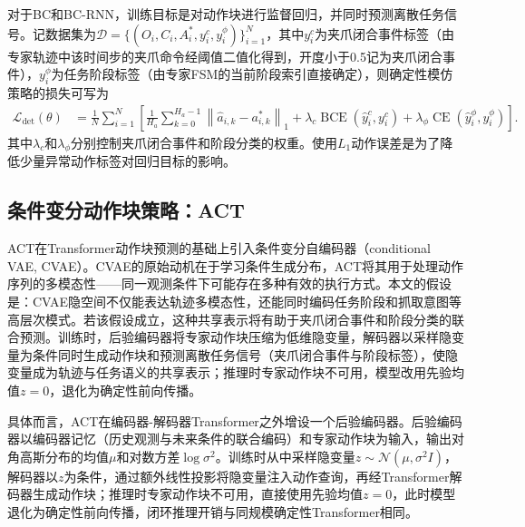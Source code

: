 对于BC和BC-RNN，训练目标是对动作块进行监督回归，并同时预测离散任务信号。记数据集为$\mathcal{D}=\{(O_i,C_i,A_i^*,y_i^c,y_i^\phi)\}_{i=1}^{N}$，其中$y_i^c$为夹爪闭合事件标签（由专家轨迹中该时间步的夹爪命令经阈值二值化得到，开度小于0.5记为夹爪闭合事件），$y_i^\phi$为任务阶段标签（由专家FSM的当前阶段索引直接确定），则确定性模仿策略的损失可写为
\begin{align}
    \mathcal{L}_{\mathrm{det}}(\theta)
    &= \frac{1}{N}\sum_{i=1}^{N}
    \left[
        \frac{1}{H_a}\sum_{k=0}^{H_a-1}
        \left\|\hat{a}_{i,k}-a^*_{i,k}\right\|_1
        + \lambda_c\operatorname{BCE}(\hat{y}^c_i,y^c_i)
        + \lambda_\phi\operatorname{CE}(\hat{y}^\phi_i,y^\phi_i)
    \right].
    \label{eq:deterministic-loss}
\end{align}
其中$\lambda_c$和$\lambda_\phi$分别控制夹爪闭合事件和阶段分类的权重。使用$L_1$动作误差是为了降低少量异常动作标签对回归目标的影响。

\subsection{条件变分动作块策略：ACT}

ACT在Transformer动作块预测的基础上引入条件变分自编码器（conditional VAE, CVAE）。CVAE的原始动机在于学习条件生成分布，ACT将其用于处理动作序列的多模态性——同一观测条件下可能存在多种有效的执行方式\citep{sohn2015learning,zhao2023learning}。本文的假设是：CVAE隐空间不仅能表达轨迹多模态性，还能同时编码任务阶段和抓取意图等高层次模式。若该假设成立，这种共享表示将有助于夹爪闭合事件和阶段分类的联合预测。训练时，后验编码器将专家动作块压缩为低维隐变量，解码器以采样隐变量为条件同时生成动作块和预测离散任务信号（夹爪闭合事件与阶段标签），使隐变量成为轨迹与任务语义的共享表示；推理时专家动作块不可用，模型改用先验均值$z=0$，退化为确定性前向传播。

具体而言，ACT在编码器-解码器Transformer之外增设一个后验编码器。后验编码器以编码器记忆（历史观测与未来条件的联合编码）和专家动作块为输入，输出对角高斯分布的均值$\mu$和对数方差$\log\sigma^2$。训练时从中采样隐变量$z\sim\mathcal{N}(\mu,\sigma^2 I)$，解码器以$z$为条件，通过额外线性投影将隐变量注入动作查询，再经Transformer解码器生成动作块；推理时专家动作块不可用，直接使用先验均值$z=0$，此时模型退化为确定性前向传播，闭环推理开销与同规模确定性Transformer相同\citep{kingma2014autoencoding,sohn2015learning,zhao2023learning}。

